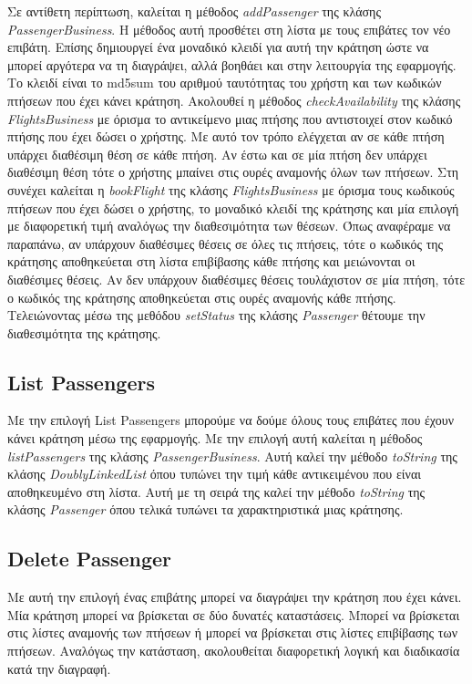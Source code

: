 \documentclass[a4paper]{article}
\begin{document}
Σε αντίθετη περίπτωση, καλείται η μέθοδος \emph{addPassenger} της κλάσης
\emph{PassengerBusiness}. Η μέθοδος αυτή προσθέτει στη λίστα με τους επιβάτες
τον νέο επιβάτη. Επίσης δημιουργεί ένα μοναδικό κλειδί για αυτή την κράτηση ώστε
να μπορεί αργότερα να τη διαγράψει, αλλά βοηθάει και στην λειτουργία της
εφαρμογής. Το κλειδί είναι το md5sum του αριθμού ταυτότητας του χρήστη και των
κωδικών πτήσεων που έχει κάνει κράτηση. Ακολουθεί η μέθοδος \emph{checkAvailability} της κλάσης
\emph{FlightsBusiness} με όρισμα το αντικείμενο μιας πτήσης που αντιστοιχεί στον
κωδικό πτήσης που έχει δώσει ο χρήστης. Με αυτό τον τρόπο ελέγχεται αν σε κάθε
πτήση υπάρχει διαθέσιμη θέση σε κάθε πτήση. Αν έστω και σε μία πτήση δεν υπάρχει
διαθέσιμη θέση τότε ο χρήστης μπαίνει στις ουρές αναμονής όλων των πτήσεων. Στη
συνέχει καλείται η \emph{bookFlight} της κλάσης \emph{FlightsBusiness} με όρισμα
τους κωδικούς πτήσεων που έχει δώσει ο χρήστης, το μοναδικό κλειδί της κράτησης
και μία επιλογή με διαφορετική τιμή αναλόγως την διαθεσιμότητα των θέσεων. Όπως
αναφέραμε να παραπάνω, αν υπάρχουν διαθέσιμες θέσεις σε όλες τις πτήσεις, τότε ο
κωδικός της κράτησης αποθηκεύεται στη λίστα επιβίβασης κάθε πτήσης και
μειώνονται οι διαθέσιμες θέσεις. Αν δεν υπάρχουν διαθέσιμες θέσεις τουλάχιστον
σε μία πτήση, τότε ο κωδικός της κράτησης αποθηκεύεται στις ουρές αναμονής κάθε
πτήσης. Τελειώνοντας μέσω της μεθόδου \emph{setStatus} της κλάσης
\emph{Passenger} θέτουμε την διαθεσιμότητα της κράτησης.

\subsection{List Passengers}
Με την επιλογή List Passengers μπορούμε να δούμε όλους τους επιβάτες που έχουν
κάνει κράτηση μέσω της εφαρμογής. Με την επιλογή αυτή καλείται η μέθοδος
\emph{listPassengers} της κλάσης \emph{PassengerBusiness}. Αυτή καλεί την μέθοδο
\emph{toString} της κλάσης \emph{DoublyLinkedList} όπου τυπώνει την τιμή κάθε
αντικειμένου που είναι αποθηκευμένο στη λίστα. Αυτή με τη σειρά της καλεί την
μέθοδο \emph{toString} της κλάσης \emph{Passenger} όπου τελικά τυπώνει τα
χαρακτηριστικά μιας κράτησης.

\subsection{Delete Passenger}
Με αυτή την επιλογή ένας επιβάτης μπορεί να διαγράψει την κράτηση που έχει
κάνει. Μία κράτηση μπορεί να βρίσκεται σε δύο δυνατές καταστάσεις. Μπορεί να
βρίσκεται στις λίστες αναμονής των πτήσεων ή μπορεί να βρίσκεται στις λίστες
επιβίβασης των πτήσεων. Αναλόγως την κατάσταση, ακολουθείται διαφορετική λογική
και διαδικασία κατά την διαγραφή.
\end{document}
